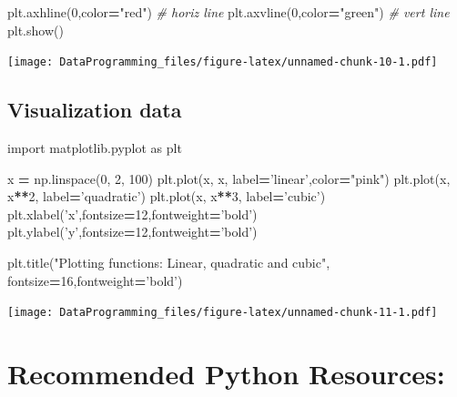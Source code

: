 \documentclass[]{book}
\newenvironment{Shaded}{\begin{snugshade}}{\end{snugshade}}
\newcommand{\CommentTok}[1]{\textcolor[rgb]{0.56,0.35,0.01}{\textit{#1}}}
\newcommand{\DecValTok}[1]{\textcolor[rgb]{0.00,0.00,0.81}{#1}}
\newcommand{\ImportTok}[1]{#1}
\newcommand{\NormalTok}[1]{#1}
\newcommand{\OperatorTok}[1]{\textcolor[rgb]{0.81,0.36,0.00}{\textbf{#1}}}
\newcommand{\StringTok}[1]{\textcolor[rgb]{0.31,0.60,0.02}{#1}}
\begin{document}
\begin{Shaded}
\begin{Highlighting}[]
\NormalTok{plt.axhline(}\DecValTok{0}\NormalTok{,color}\OperatorTok{=}\StringTok{"red"}\NormalTok{) }\CommentTok{# horiz line}
\NormalTok{plt.axvline(}\DecValTok{0}\NormalTok{,color}\OperatorTok{=}\StringTok{"green"}\NormalTok{) }\CommentTok{# vert line}
\NormalTok{plt.show()}
\end{Highlighting}
\end{Shaded}

\texttt{[image: DataProgramming\_files/figure-latex/unnamed-chunk-10-1.pdf]}

\hypertarget{visualization-data}{%
\subsection{Visualization data}\label{visualization-data}}

\begin{Shaded}
\begin{Highlighting}[]

\ImportTok{import}\NormalTok{ matplotlib.pyplot }\ImportTok{as}\NormalTok{ plt}

\NormalTok{x }\OperatorTok{=}\NormalTok{ np.linspace(}\DecValTok{0}\NormalTok{, }\DecValTok{2}\NormalTok{, }\DecValTok{100}\NormalTok{)}
\NormalTok{plt.plot(x, x, label}\OperatorTok{=}\StringTok{'linear'}\NormalTok{,color}\OperatorTok{=}\StringTok{"pink"}\NormalTok{)}
\NormalTok{plt.plot(x, x}\OperatorTok{**}\DecValTok{2}\NormalTok{, label}\OperatorTok{=}\StringTok{'quadratic'}\NormalTok{)}
\NormalTok{plt.plot(x, x}\OperatorTok{**}\DecValTok{3}\NormalTok{, label}\OperatorTok{=}\StringTok{'cubic'}\NormalTok{)}
\NormalTok{plt.xlabel(}\StringTok{'x'}\NormalTok{,fontsize}\OperatorTok{=}\DecValTok{12}\NormalTok{,fontweight}\OperatorTok{=}\StringTok{'bold'}\NormalTok{)}
\NormalTok{plt.ylabel(}\StringTok{'y'}\NormalTok{,fontsize}\OperatorTok{=}\DecValTok{12}\NormalTok{,fontweight}\OperatorTok{=}\StringTok{'bold'}\NormalTok{)}

\NormalTok{plt.title(}\StringTok{"Plotting functions: Linear, quadratic and cubic"}\NormalTok{, fontsize}\OperatorTok{=}\DecValTok{16}\NormalTok{,fontweight}\OperatorTok{=}\StringTok{'bold'}\NormalTok{)}
\end{Highlighting}
\end{Shaded}

\texttt{[image: DataProgramming\_files/figure-latex/unnamed-chunk-11-1.pdf]}

\hypertarget{recommended-python-resources}{%
\section{Recommended Python Resources:}\label{recommended-python-resources}}
\end{document}
